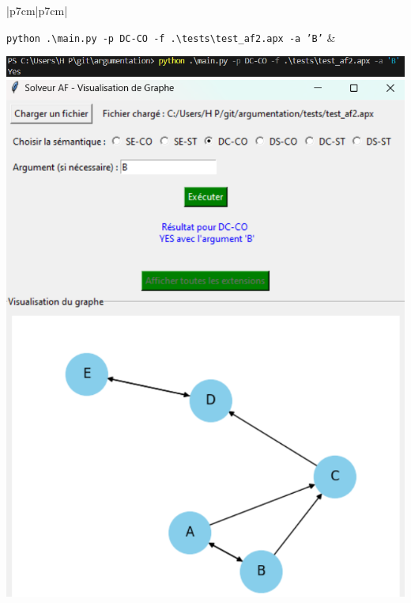 \documentclass{rapportECL}
\begin{document}
\begin{longtable}{|p{7cm}|p{7cm}|}
	
	\hline
	\texttt{python .\textbackslash main.py -p DC-CO -f .\textbackslash tests\textbackslash test\_af2.apx -a 'B'} & 
	\begin{minipage}{\linewidth}
		\centering
		\includegraphics[width=\linewidth]{img/b_consol.png} \\[0.2cm]
		\includegraphics[width=\linewidth]{img/b_ui.png}
	\end{minipage} \\[0.2cm] \\
	\hline



\end{longtable}
\end{document}
